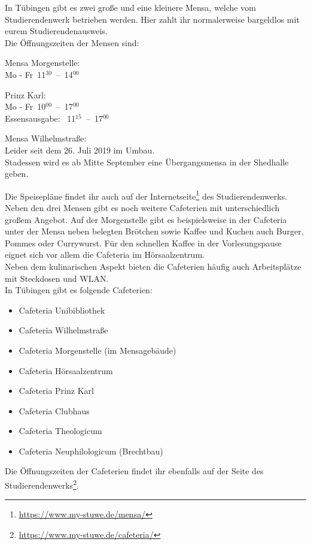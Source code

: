 In Tübingen gibt es zwei große und eine kleinere Mensa, welche vom Studierendenwerk betrieben werden. Hier zahlt ihr normalerweise bargeldlos mit eurem Studierendenausweis.\\
Die Öffnungszeiten der Mensen sind:
\begin{center}

Mensa Morgenstelle:\\
Mo - Fr~11$^{\underline{30}}$~--~14$^{\underline{00}}$

\bigskip

Prinz Karl:\\
Mo - Fr~10$^{\underline{00}}$~--~17$^{\underline{00}}$\\
Essensausgabe: ~11$^{\underline{15}}$~--~17$^{\underline{00}}$

\nopagebreak
Mensa Wilhelmstraße:\\
Leider seit dem 26. Juli 2019 im Umbau. \\
Stadessen wird es ab Mitte September eine Übergangsmensa in der Shedhalle geben.

\end{center}

Die Speisepläne findet ihr auch auf der Internetseite\footnote{\url{https://www.my-stuwe.de/mensa/}} des Studierendenwerks.\\

Neben den drei Mensen gibt es noch weitere Cafeterien mit unterschiedlich großem Angebot. Auf der Morgenstelle gibt es beispielsweise in der Cafeteria unter der Mensa neben belegten Brötchen sowie Kaffee und Kuchen auch Burger, Pommes oder Currywurst. Für den schnellen Kaffee in der Vorlesungspause eignet sich vor allem die Cafeteria im Hörsaalzentrum.\\
Neben dem kulinarischen Aspekt bieten die Cafeterien häufig auch Arbeitsplätze mit Steckdosen und WLAN.\\
In Tübingen gibt es folgende Cafeterien:
\begin{itemize}
	\item Cafeteria Unibibliothek
	\item Cafeteria Wilhelmstraße
	\item Cafeteria Morgenstelle (im Mensagebäude)
	\item Cafeteria Hörsaalzentrum
	\item Cafeteria Prinz Karl
	\item Cafeteria Clubhaus
	\item Cafeteria Theologicum
	\item Cafeteria Neuphilologicum (Brechtbau)
\end{itemize}
Die Öffnungszeiten der Cafeterien findet ihr ebenfalls auf der Seite des Studierendenwerks\footnote{\url{https://www.my-stuwe.de/cafeteria/}}.
